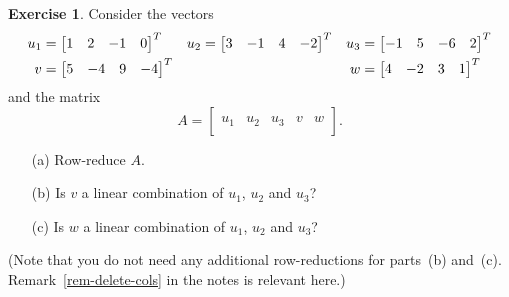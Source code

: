 \documentclass[a4paper]{amsart}
\theoremstyle{definition}
\newtheorem{exercise}{Exercise}
\begin{document}
\begin{exercise}\label{ex-combination-iv}
 Consider the vectors
 \begin{align*}
  u_1 &= \left[\begin{matrix} 1 &  2 & -1 & 0 \end{matrix}\right]^T &
  u_2 &= \left[\begin{matrix} 3 & -1 & 4 & -2 \end{matrix}\right]^T &
  u_3 &= \left[\begin{matrix} -1 & 5 & -6 & 2 \end{matrix}\right]^T \\
  v   &= \left[\begin{matrix} 5 & -4 & 9 & -4 \end{matrix}\right]^T &&&
  w   &= \left[\begin{matrix} 4 & -2 & 3 & 1 \end{matrix}\right]^T 
 \end{align*}
 and the matrix
 \[ A = \left[\begin{array}{c|c|c|c|c}
          &&&& \\
          u_1 & u_2 & u_3 & v & w \\
          &&&&
        \end{array}\right].
 \]
 \begin{itemize}
  \item[(a)] Row-reduce $A$.
  \item[(b)] Is $v$ a linear combination of $u_1$, $u_2$ and $u_3$?
  \item[(c)] Is $w$ a linear combination of $u_1$, $u_2$ and $u_3$?
 \end{itemize}
 (Note that you do not need any additional row-reductions for
 parts~(b) and~(c).  Remark~\ref{rem-delete-cols} in the notes is
 relevant here.)
\end{exercise}
\end{document}
